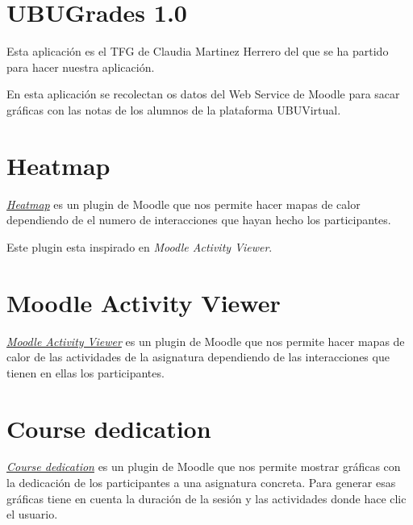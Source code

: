 
\section{UBUGrades 1.0}\label{ubugrades--10}

Esta aplicación es el TFG de Claudia Martinez Herrero \cite{claudia} del que se ha partido para hacer nuestra aplicación.

En esta aplicación se recolectan os datos del Web Service de Moodle para sacar gráficas con las notas de los alumnos de la plataforma UBUVirtual.

\section{Heatmap}\label{heatmap}

\href{https://moodle.org/plugins/block_heatmap}{\emph{Heatmap}} es un plugin de Moodle que nos permite hacer mapas de calor dependiendo de el numero de interacciones que hayan hecho los participantes.

Este plugin esta inspirado en \emph{Moodle Activity Viewer}.

\section{ Moodle Activity Viewer}\label{moodle-activity-viewer}

\href{https://damos.world/2013/08/30/the-moodle-activity-viewer-mav-heatmaps-of-student-activity/}{ \emph{Moodle Activity Viewer}} es un plugin de Moodle que nos permite hacer mapas de calor de las actividades de la asignatura dependiendo de las interacciones que tienen en ellas los participantes.


\section{Course dedication}\label{course-dedication}

\href{https://moodle.org/plugins/block_dedication}{\emph{Course dedication}} es un plugin de Moodle que nos permite mostrar gráficas con la dedicación de los participantes a una asignatura concreta. Para generar esas gráficas tiene en cuenta la duración de la sesión y las actividades donde hace clic el usuario.